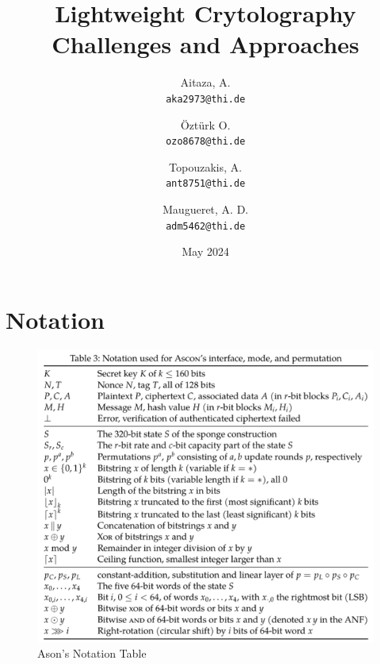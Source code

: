 \documentclass{article}
\date{May 2024}
\title{Lightweight Crytolography Challenges and Approaches}
\author{
  Aitaza, A. \\
  \texttt{aka2973@thi.de}
  \and
  Öztürk O.\\
  \texttt{ozo8678@thi.de}   
  \and
  Topouzakis, A. \\
  \texttt{ant8751@thi.de}
  \and
  Maugueret, A. D.\\
  \texttt{adm5462@thi.de}
  }
\begin{document}
\maketitle
\tableofcontents

\section*{Notation}

\begin{figure}[H] 
    \centering 
    \includegraphics[width=1\textwidth]{figures/ascon-notation.png}
    \caption{Ason's Notation Table \cite{Ascon-v1.2}}
    \label{fig:ascon-notation} 
  \end{figure}








\end{document}
